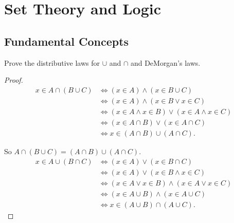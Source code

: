 \chapter{Set Theory and Logic}

\section{Fundamental Concepts}

\begin{exercise}\label{chapter1:section1:exercise1}
    Prove the distributive laws for $\cup$ and $\cap$ and DeMorgan's laws.
\end{exercise}

\begin{proof}
    \begin{align*}
        x \in A\cap (B\cup C) & \Longleftrightarrow (x\in A) \land (x \in B\cup C)                \\
                              & \Longleftrightarrow (x\in A) \land (x\in B \lor x\in C)           \\
                              & \Longleftrightarrow (x\in A\land x\in B)\lor (x\in A\land x\in C) \\
                              & \Longleftrightarrow (x\in A\cap B) \lor (x\in A\cap C)            \\
                              & \Longleftrightarrow x\in (A\cap B)\cup (A\cap C).
    \end{align*}

    So $A\cap (B\cup C) = (A\cap B)\cup (A\cap C)$.
    \begin{align*}
        x \in A\cup (B\cap C) & \Longleftrightarrow (x\in A) \lor (x\in B\cap C)                  \\
                              & \Longleftrightarrow (x\in A) \lor (x\in B \land x\in C)           \\
                              & \Longleftrightarrow (x\in A\lor x\in B) \land (x\in A\lor x\in C) \\
                              & \Longleftrightarrow (x\in A\cup B)\land (x\in A\cup C)            \\
                              & \Longleftrightarrow x\in (A\cup B)\cap (A\cup C).
    \end{align*}


\end{proof}
